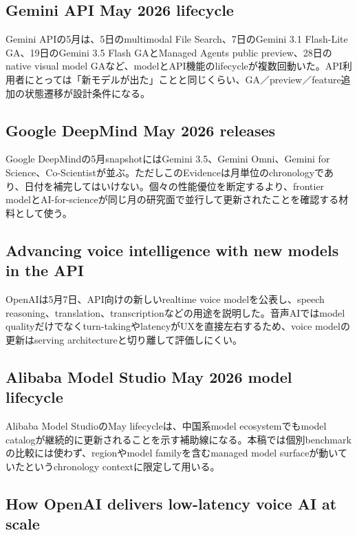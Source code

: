\subsection{Gemini API May 2026 lifecycle}

Gemini APIの5月は、5日のmultimodal File Search、7日のGemini 3.1 Flash-Lite GA、19日のGemini 3.5 Flash GAとManaged Agents public preview、28日のnative visual model GAなど、modelとAPI機能のlifecycleが複数回動いた。API利用者にとっては「新モデルが出た」ことと同じくらい、GA／preview／feature追加の状態遷移が設計条件になる。\autocite{src-a24fd97eb3d0}


\subsection{Google DeepMind May 2026 releases}

Google DeepMindの5月snapshotにはGemini 3.5、Gemini Omni、Gemini for Science、Co-Scientistが並ぶ。ただしこのEvidenceは月単位のchronologyであり、日付を補完してはいけない。個々の性能優位を断定するより、frontier modelとAI-for-scienceが同じ月の研究面で並行して更新されたことを確認する材料として使う。\autocite{src-dd5d9b8662f3}


\subsection{Advancing voice intelligence with new models in the API}

OpenAIは5月7日、API向けの新しいrealtime voice modelを公表し、speech reasoning、translation、transcriptionなどの用途を説明した。音声AIではmodel qualityだけでなくturn-takingやlatencyがUXを直接左右するため、voice modelの更新はserving architectureと切り離して評価しにくい。\autocite{src-24a3c172de48}


\subsection{Alibaba Model Studio May 2026 model lifecycle}

Alibaba Model StudioのMay lifecycleは、中国系model ecosystemでもmodel catalogが継続的に更新されることを示す補助線になる。本稿では個別benchmarkの比較には使わず、regionやmodel familyを含むmanaged model surfaceが動いていたというchronology contextに限定して用いる。\autocite{src-eac8dfbeb78c}


\subsection{How OpenAI delivers low-latency voice AI at scale}

